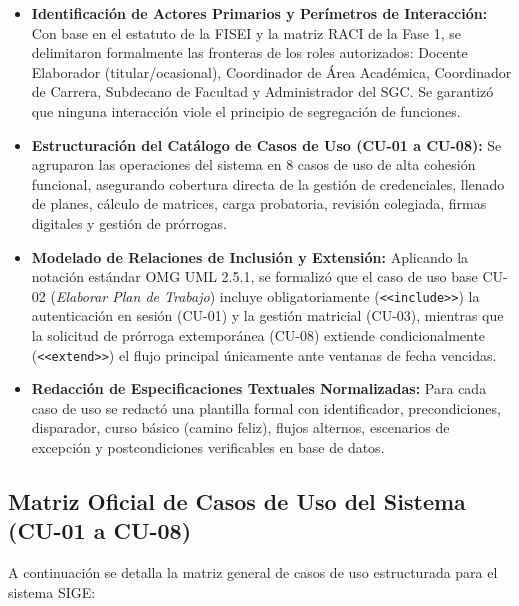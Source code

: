 \documentclass[12pt,a4paper]{article}
\begin{document}
\begin{itemize}[leftmargin=1.5em, itemsep=4pt]
    \item \textbf{Identificación de Actores Primarios y Perímetros de Interacción:} Con base en el estatuto de la FISEI y la matriz RACI de la Fase 1, se delimitaron formalmente las fronteras de los roles autorizados: Docente Elaborador (titular/ocasional), Coordinador de Área Académica, Coordinador de Carrera, Subdecano de Facultad y Administrador del SGC. Se garantizó que ninguna interacción viole el principio de segregación de funciones.
    \item \textbf{Estructuración del Catálogo de Casos de Uso (CU-01 a CU-08):} Se agruparon las operaciones del sistema en 8 casos de uso de alta cohesión funcional, asegurando cobertura directa de la gestión de credenciales, llenado de planes, cálculo de matrices, carga probatoria, revisión colegiada, firmas digitales y gestión de prórrogas.
    \item \textbf{Modelado de Relaciones de Inclusión y Extensión:} Aplicando la notación estándar OMG UML 2.5.1, se formalizó que el caso de uso base CU-02 (\textit{Elaborar Plan de Trabajo}) incluye obligatoriamente (\texttt{<<include>>}) la autenticación en sesión (CU-01) y la gestión matricial (CU-03), mientras que la solicitud de prórroga extemporánea (CU-08) extiende condicionalmente (\texttt{<<extend>>}) el flujo principal únicamente ante ventanas de fecha vencidas.
    \item \textbf{Redacción de Especificaciones Textuales Normalizadas:} Para cada caso de uso se redactó una plantilla formal con identificador, precondiciones, disparador, curso básico (camino feliz), flujos alternos, escenarios de excepción y postcondiciones verificables en base de datos.
\end{itemize}

\subsection{Matriz Oficial de Casos de Uso del Sistema (CU-01 a CU-08)}
A continuación se detalla la matriz general de casos de uso estructurada para el sistema SIGE:
\end{document}
